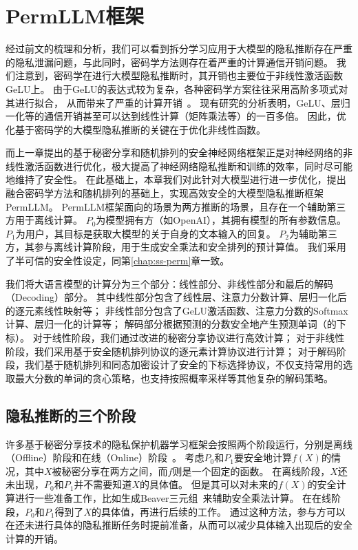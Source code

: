 \section{PermLLM框架}
经过前文的梳理和分析，我们可以看到拆分学习应用于大模型的隐私推断存在严重的隐私泄漏问题，与此同时，密码学方法则存在着严重的计算通信开销问题。
%
我们注意到，密码学在进行大模型隐私推断时，其开销也主要位于非线性激活函数GeLU上。
由于GeLU的表达式较为复杂，各种密码学方案往往采用高阶多项式对其进行拟合，
从而带来了严重的计算开销~\cite{hou2023ciphergpt,lu2023bumblebee,dong2023puma,pang_2024_bolt_transformer}。
%
现有研究的分析表明，GeLU、层归一化等的通信开销甚至可以达到线性计算（矩阵乘法等）的一百多倍。
%
因此，优化基于密码学的大模型隐私推断的关键在于优化非线性函数。
%
%

而上一章提出的基于秘密分享和随机排列的安全神经网络框架正是对神经网络的非线性激活函数进行优化，极大提高了神经网络隐私推断和训练的效率，同时尽可能地维持了安全性。
%
在此基础上，本章我们对此针对大模型进行进一步优化，提出融合密码学方法和随机排列的基础上，实现高效安全的大模型隐私推断框架PermLLM。
%
PermLLM框架面向的场景为两方推断的场景，且存在一个辅助第三方用于离线计算。
%
$P_0$为模型拥有方（如OpenAI），其拥有模型的所有参数信息。
%
$P_1$为用户，其目标是获取大模型的关于自身的文本输入的回复。
%
$P_2$为辅助第三方，其参与离线计算阶段，用于生成安全乘法和安全排列的预计算值。
%
我们采用了半可信的安全性设定，同第\ref{chap:ss-perm}章一致。


我们将大语言模型的计算分为三个部分：线性部分、非线性部分和最后的解码（Decoding）部分。
其中线性部分包含了线性层、注意力分数计算、层归一化后的逐元素线性映射等；
非线性部分包含了GeLU激活函数、注意力分数的Softmax计算、层归一化的计算等；
解码部分根据预测的分数安全地产生预测单词（的下标）。
%
对于线性阶段，我们通过改进的秘密分享协议进行高效计算；
对于非线性阶段，我们采用基于安全随机排列协议的逐元素计算协议进行计算；
对于解码阶段，我们基于随机排列和同态加密设计了安全的下标选择协议，不仅支持常用的选取最大分数的单词的贪心策略，也支持按照概率采样等其他复杂的解码策略。
%


\subsection{隐私推断的三个阶段}
许多基于秘密分享技术的隐私保护机器学习框架会按照两个阶段运行，分别是离线（Offline）阶段和在线（Online）阶段~\cite{mohassel2017secureml,riazi_2018_chameleon}。
%
考虑$P_0$和$P_1$要安全地计算$f(X)$的情况，其中$X$被秘密分享在两方之间，而$f$则是一个固定的函数。
%
在离线阶段，$X$还未出现，$P_0$和$P_1$并不需要知道$X$的具体值。
%
但是其可以对未来的$f(X)$的安全计算进行一些准备工作，比如生成Beaver三元组~\cite{beaver1992efficient}来辅助安全乘法计算。
%
在在线阶段，$P_0$和$P_1$得到了$X$的具体值，再进行后续的工作。
通过这种方法，参与方可以在还未进行具体的隐私推断任务时提前准备，从而可以减少具体输入出现后的安全计算的开销。


